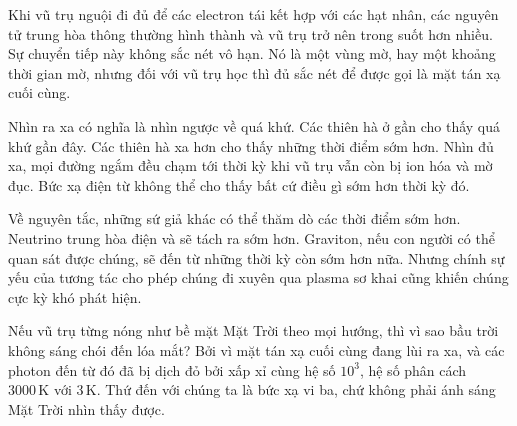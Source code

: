 Khi vũ trụ nguội đi đủ để các electron tái kết hợp với các hạt nhân, các nguyên tử trung hòa thông thường hình thành và vũ trụ trở nên trong suốt hơn nhiều. Sự chuyển tiếp này không sắc nét vô hạn. Nó là một vùng mờ, hay một khoảng thời gian mờ, nhưng đối với vũ trụ học thì đủ sắc nét để được gọi là mặt tán xạ cuối cùng.

Nhìn ra xa có nghĩa là nhìn ngược về quá khứ. Các thiên hà ở gần cho thấy quá khứ gần đây. Các thiên hà xa hơn cho thấy những thời điểm sớm hơn. Nhìn đủ xa, mọi đường ngắm đều chạm tới thời kỳ khi vũ trụ vẫn còn bị ion hóa và mờ đục. Bức xạ điện từ không thể cho thấy bất cứ điều gì sớm hơn thời kỳ đó.

Về nguyên tắc, những sứ giả khác có thể thăm dò các thời điểm sớm hơn. Neutrino trung hòa điện và sẽ tách ra sớm hơn. Graviton, nếu con người có thể quan sát được chúng, sẽ đến từ những thời kỳ còn sớm hơn nữa. Nhưng chính sự yếu của tương tác cho phép chúng đi xuyên qua plasma sơ khai cũng khiến chúng cực kỳ khó phát hiện.

Nếu vũ trụ từng nóng như bề mặt Mặt Trời theo mọi hướng, thì vì sao bầu trời không sáng chói đến lóa mắt? Bởi vì mặt tán xạ cuối cùng đang lùi ra xa, và các photon đến từ đó đã bị dịch đỏ bởi xấp xỉ cùng hệ số \(10^3\), hệ số phân cách \(3000\,\mathrm K\) với \(3\,\mathrm K\). Thứ đến với chúng ta là bức xạ vi ba, chứ không phải ánh sáng Mặt Trời nhìn thấy được.

\begin{classroomqa}
\end{classroomqa}

\begin{classroomqa}
\end{classroomqa}

